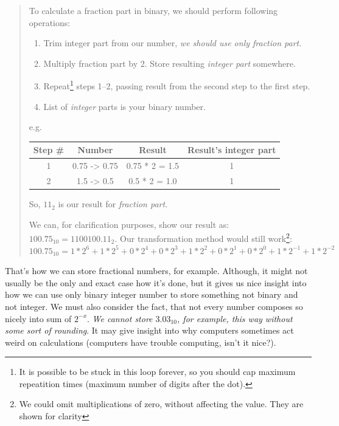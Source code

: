 \documentclass{article}
\begin{document}
            \begin{quote}
                To calculate a fraction part in binary, we should perform following operations:

                \begin{enumerate}
                    \item Trim integer part from our number, \emph{we should use only fraction part}.
                    \item Multiply fraction part by 2. Store resulting \emph{integer part} somewhere.
                    \item Repeat\footnote{It is possible to be stuck in this loop forever, so you should cap maximum repeatition times (maximum number of digits after the dot).} steps 1--2, passing result from the second step to the first step.
                    \item List of \emph{integer} parts is your binary number.
                \end{enumerate}

                e.g.\\
                \begin{longtable}{|c|c|c|c|}
                    \hline
                    Step \# & Number & Result & Result's integer part \\\hline
                    1 & 0.75 -> 0.75 & 0.75 * 2 = 1.5 & 1 \\\hline
                    2 & 1.5 -> 0.5 & 0.5 * 2 = 1.0 & 1 \\\hline                    
                \end{longtable}

                So, $11_2$ is our result for \emph{fraction part}.

                We can, for clarification purposes, show our result as: $100.75_{10} = 1100100.11_2$. Our transformation method 
                would still work\footnote{We could omit multiplications of zero, without affecting the value. They are shown for clarity}: \\

                $100.75_{10} = 1 * 2^6 + 1 * 2^5 + 0 * 2^4 + 0 * 2^3 + 1 * 2^2 + 0 * 2^1 + 0 * 2^0 + 1 * 2^{-1} + 1 * 2^{-2}$ 
            \end{quote}

            That's how we can store fractional numbers, for example. Although, it might not usually be the only and exact case how it's done, but it gives us nice insight
            into how we can use only binary integer number to store something not binary and not integer. We must also consider the fact, that not every number composes
            so nicely into sum of $2^{-x}$. \emph{We cannot store $3.03_{10}$, for example, this way without some sort of rounding}. It may give insight into why computers
            sometimes act weird on calculations (computers have trouble computing, isn't it nice?). \par
\end{document}
